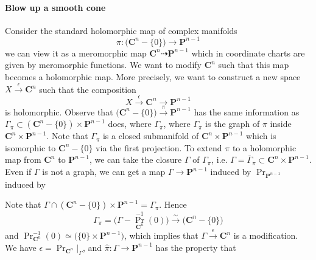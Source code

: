 \documentclass[
11pt, %
letterpaper， %
oneside, %
headinclude,footinclude, %
BCOR5mm, %
]{scrartcl}
\newcommand{\C}{{\mathbf{C}}}
\newcommand{\cp}{{\mathbf{P}}}
\newcommand{\proj}{\operatorname{Pr}}
\begin{document}
\paragraph{Blow up a smooth cone}
	Consider the standard holomorphic map of complex manifolds
	\begin{equation*}
	\pi: \big(\C^n-\{0\}\big) \longrightarrow \cp^{n-1}
	\end{equation*}
	we can view it as a meromorphic map $\C^n \dashrightarrow \cp^{n-1}$ which in coordinate charts are given by meromorphic functions. We want to modify $\C^n$ such that this map becomes a holomorphic map. More precisely, we want to construct a new space $X\stackrel{\epsilon}{\rightarrow} \C^n$ such that the composition
	\begin{equation*}
	X\stackrel{\epsilon}{\rightarrow} \C^n \to \cp^{n-1}
	\end{equation*}
	is holomorphic. Observe that $\big(\C^n-\{0\}\big) \stackrel{\pi}{\rightarrow}\cp^{n-1}$ has the same information as $\Gamma_{\pi}\subset (\C^n-\{0\})\times \cp^{n-1}$ does, where $\Gamma_{\pi}$, where $\Gamma_{\pi}$ is the graph of $\pi$ inside $\C^n \times \cp^{n-1}$. Note that $\Gamma_{\pi}$ is a closed submanifold of $\C^n \times \cp^{n-1}$ which is isomorphic to $\C^n-\{0\}$ via the first projection. To extend $\pi$ to a holomorphic map from $\C^n$ to $\cp^{n-1}$, we can take the closure $\Gamma$ of $\Gamma_{\pi}$,   i.e. $\Gamma =\overline{\Gamma}_{\pi}\subset \C^n \times \cp^{n-1}$. Even if $\Gamma $ is not a graph, we can get a map $\Gamma \to \cp^{n-1}$ induced by $\proj_{\cp^{n-1}}$ induced by   
		\begin{center}
	\end{center}
Note that $\Gamma \cap (\C^n-\{0\})\times \cp^{n-1}=\Gamma_{\pi}$. Hence 
\begin{equation*}
\Gamma_{\pi}=\big(\Gamma -\proj_{\C^n}^{-1}(0)\big)\stackrel{\sim}{\longrightarrow} \big(\C^n-\{0\}\big)
\end{equation*}
and $\proj_{\C^n}^{-1}(0)\simeq \big(\{0\}\times \cp^{n-1}\big)$, which implies that $\Gamma \stackrel{\epsilon}{\rightarrow} \C^n$ is a modification. We have $\epsilon=\proj_{\C^{n}}\big|_{\Gamma}$, and $\hat{\pi}:\Gamma \to \cp^{n-1}$ has the property that
\begin{center}
\end{center}
\end{document}
